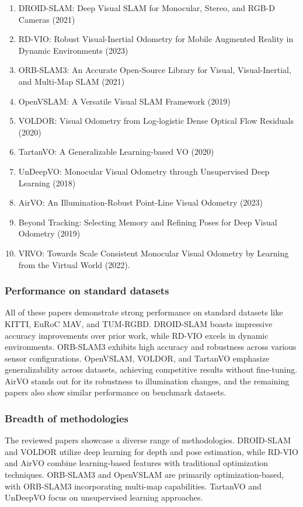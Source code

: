 \documentclass{article}
\begin{document}
\begin{enumerate}
    \item DROID-SLAM: Deep Visual SLAM for Monocular, Stereo, and RGB-D Cameras (2021)
    \item RD-VIO: Robust Visual-Inertial Odometry for Mobile Augmented Reality in Dynamic Environments (2023)
    \item ORB-SLAM3: An Accurate Open-Source Library for Visual, Visual-Inertial, and Multi-Map SLAM (2021)
    \item OpenVSLAM: A Versatile Visual SLAM Framework (2019)
    \item VOLDOR: Visual Odometry from Log-logistic Dense Optical Flow Residuals (2020)
    \item TartanVO: A Generalizable Learning-based VO (2020)
    \item UnDeepVO: Monocular Visual Odometry through Unsupervised Deep Learning (2018)
    \item AirVO: An Illumination-Robust Point-Line Visual Odometry (2023)
    \item Beyond Tracking: Selecting Memory and Refining Poses for Deep Visual Odometry (2019)
    \item VRVO: Towards Scale Consistent Monocular Visual Odometry by Learning from the Virtual World (2022).
\end{enumerate}
\subsubsection*{Performance on standard datasets}
All of these papers demonstrate strong performance on standard datasets like KITTI, EuRoC MAV, and TUM-RGBD. DROID-SLAM boasts impressive accuracy improvements over prior work, while RD-VIO excels in dynamic environments. ORB-SLAM3 exhibits high accuracy and robustness across various sensor configurations. OpenVSLAM, VOLDOR, and TartanVO emphasize generalizability across datasets, achieving competitive results without fine-tuning. AirVO stands out for its robustness to illumination changes, and the remaining papers also show similar performance on benchmark datasets.  

\subsubsection*{Breadth of methodologies}
The reviewed papers showcase a diverse range of methodologies. DROID-SLAM and VOLDOR utilize deep learning for depth and pose estimation, while RD-VIO and AirVO combine learning-based features with traditional optimization techniques. ORB-SLAM3 and OpenVSLAM are primarily optimization-based, with ORB-SLAM3 incorporating multi-map capabilities. TartanVO and UnDeepVO focus on unsupervised learning approaches.
\end{document}
